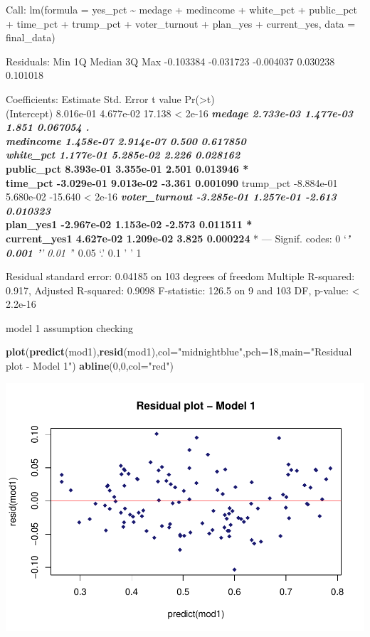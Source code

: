 \documentclass[
]{article}
\newenvironment{Shaded}{\begin{snugshade}}{\end{snugshade}}
\newcommand{\DataTypeTok}[1]{\textcolor[rgb]{0.13,0.29,0.53}{#1}}
\newcommand{\DecValTok}[1]{\textcolor[rgb]{0.00,0.00,0.81}{#1}}
\newcommand{\KeywordTok}[1]{\textcolor[rgb]{0.13,0.29,0.53}{\textbf{#1}}}
\newcommand{\NormalTok}[1]{#1}
\newcommand{\StringTok}[1]{\textcolor[rgb]{0.31,0.60,0.02}{#1}}
\begin{document}
Call: lm(formula = yes\_pct \textasciitilde{} medage + medincome +
white\_pct + public\_pct + time\_pct + trump\_pct + voter\_turnout +
plan\_yes + current\_yes, data = final\_data)

Residuals: Min 1Q Median 3Q Max -0.103384 -0.031723 -0.004037 0.030238
0.101018

Coefficients: Estimate Std. Error t value
Pr(\textgreater\textbar t\textbar)\\
(Intercept) 8.016e-01 4.677e-02 17.138 \textless{} 2e-16 \textbf{\emph{
medage 2.733e-03 1.477e-03 1.851 0.067054 .\\
medincome 1.458e-07 2.914e-07 0.500 0.617850\\
white\_pct 1.177e-01 5.285e-02 2.226 0.028162 }\\
public\_pct 8.393e-01 3.355e-01 2.501 0.013946 *\\
time\_pct -3.029e-01 9.013e-02 -3.361 0.001090 } trump\_pct -8.884e-01
5.680e-02 -15.640 \textless{} 2e-16 \textbf{\emph{ voter\_turnout
-3.285e-01 1.257e-01 -2.613 0.010323 }\\
plan\_yes1 -2.967e-02 1.153e-02 -2.573 0.011511 *\\
current\_yes1 4.627e-02 1.209e-02 3.825 0.000224 }* --- Signif. codes: 0
`\emph{\textbf{' 0.001 '}' 0.01 '}' 0.05 `.' 0.1 ' ' 1

Residual standard error: 0.04185 on 103 degrees of freedom Multiple
R-squared: 0.917, Adjusted R-squared: 0.9098 F-statistic: 126.5 on 9 and
103 DF, p-value: \textless{} 2.2e-16

model 1 assumption checking

\begin{Shaded}
\begin{Highlighting}[]
\KeywordTok{plot}\NormalTok{(}\KeywordTok{predict}\NormalTok{(mod1),}\KeywordTok{resid}\NormalTok{(mod1),}\DataTypeTok{col=}\StringTok{"midnightblue"}\NormalTok{,}\DataTypeTok{pch=}\DecValTok{18}\NormalTok{,}\DataTypeTok{main=}\StringTok{"Residual plot - Model 1"}\NormalTok{)}
\KeywordTok{abline}\NormalTok{(}\DecValTok{0}\NormalTok{,}\DecValTok{0}\NormalTok{,}\DataTypeTok{col=}\StringTok{"red"}\NormalTok{)}
\end{Highlighting}
\end{Shaded}

\includegraphics{Zhong_paper_files/figure-latex/unnamed-chunk-2-1.pdf}
\end{document}
